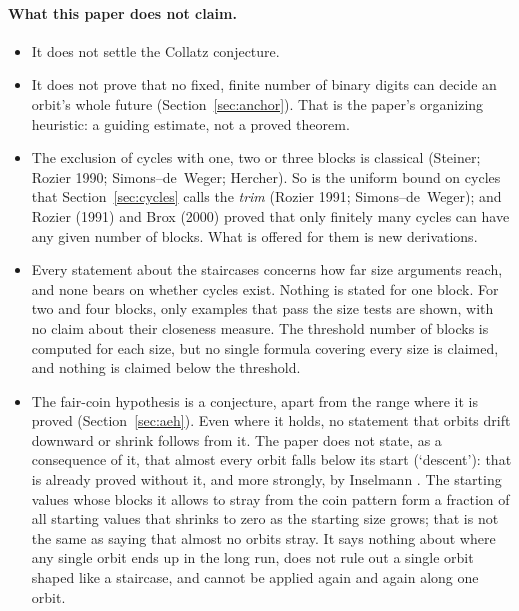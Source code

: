 \documentclass[11pt]{article}
\theoremstyle{remark}
\begin{document}
\paragraph{What this paper does not claim.}
\begin{itemize}
\item It does not settle the Collatz conjecture.
\item It does not prove that no fixed, finite number of binary digits can decide an orbit's whole future (Section~\ref{sec:anchor}). That is the paper's organizing heuristic: a guiding estimate, not a proved theorem.
\item The exclusion of cycles with one, two or three blocks is classical (Steiner; Rozier 1990; Simons--de~Weger; Hercher). So is the uniform bound on cycles that Section~\ref{sec:cycles} calls the \emph{trim} (Rozier 1991; Simons--de~Weger); and Rozier (1991) and Brox (2000) proved that only finitely many cycles can have any given number of blocks. What is offered for them is new derivations.
\item Every statement about the staircases concerns how far size arguments reach, and none bears on whether cycles exist. Nothing is stated for one block. For two and four blocks, only examples that pass the size tests are shown, with no claim about their closeness measure. The threshold number of blocks is computed for each size, but no single formula covering every size is claimed, and nothing is claimed below the threshold.
\item The fair-coin hypothesis is a conjecture, apart from the range where it is proved (Section~\ref{sec:aeh}). Even where it holds, no statement that orbits drift downward or shrink follows from it. The paper does not state, as a consequence of it, that almost every orbit falls below its start (`descent'): that is already proved without it, and more strongly, by Inselmann \cite{inselmann}. The starting values whose blocks it allows to stray from the coin pattern form a fraction of all starting values that shrinks to zero as the starting size grows; that is not the same as saying that almost no orbits stray. It says nothing about where any single orbit ends up in the long run, does not rule out a single orbit shaped like a staircase, and cannot be applied again and again along one orbit.
\end{itemize}
\end{document}
